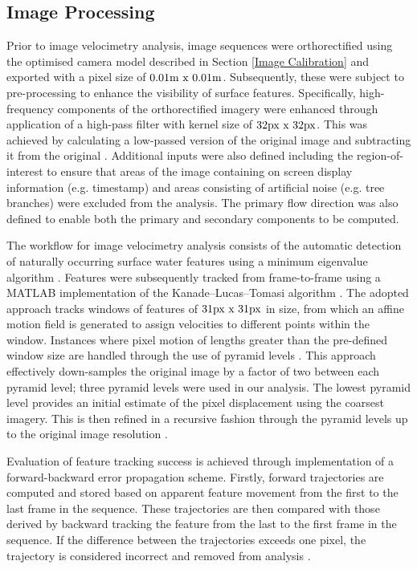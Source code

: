 \documentclass[hess, manuscript]{copernicus} %
\begin{document}
\subsection{Image Processing}
Prior to image velocimetry analysis, image sequences were orthorectified using the optimised camera model described in Section \ref{Image Calibration} and exported with a pixel size of $\textnormal{0.01m x 0.01m}$. Subsequently, these were subject to pre-processing to enhance the visibility of surface features. Specifically, high-frequency components of the orthorectified imagery were enhanced through application of a high-pass filter with kernel size of $\textnormal{32px x 32px}$. This was achieved by calculating a low-passed version of the original image and subtracting it from the original \citep{Thielicke2021}. Additional inputs were also defined including the region-of-interest to ensure that areas of the image containing on screen display information (e.g. timestamp) and areas consisting of artificial noise (e.g. tree branches) were excluded from the analysis. The primary flow direction was also defined to enable both the primary and secondary components to be computed. 

The workflow for image velocimetry analysis consists of the automatic detection of naturally occurring surface water features using a minimum eigenvalue algorithm \citep{Shi1994}. Features were subsequently tracked from frame-to-frame using a MATLAB implementation of the Kanade–Lucas–Tomasi algorithm \citep{Lucas1981, Tomasi1991, Shi1994, Perks2020a}. The adopted approach tracks windows of features of $\textnormal{31px x 31px}$ in size, from which an affine motion field is generated to assign velocities to different points within the window. Instances where pixel motion of lengths greater than the pre-defined window size are handled through the use of pyramid levels \citep{Bouguet2000}. This approach effectively down-samples the original image by a factor of two between each pyramid level; three pyramid levels were used in our analysis. The lowest pyramid level provides an initial estimate of the pixel displacement using the coarsest imagery. This is then refined in a recursive fashion through the pyramid levels up to the original image resolution \citep{Bouguet2000}.

Evaluation of feature tracking success is achieved through implementation of a forward-backward error propagation scheme. Firstly, forward trajectories are computed and stored based on apparent feature movement from the first to the last frame in the sequence. These trajectories are then compared with those derived by backward tracking the feature from the last to the first frame in the sequence. If the difference between the trajectories exceeds one pixel, the trajectory is considered incorrect and removed from analysis \citep{Kalal2010}.
\end{document}
